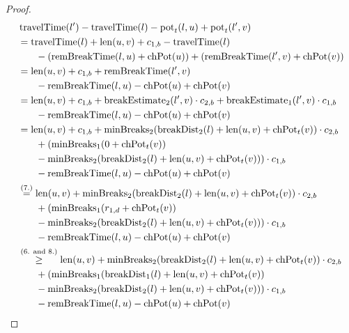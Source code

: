 \begin{proof}
	\begin{align}
		\begin{split}\label{eq:label_n_feasibility_proof_2}
			&\concretett(l') - \concretett(l) - \concretepotential_t(l,u) + \concretepotential_t(l',v)\\
			&= \concretett(l) + \len(u,v) + \restr_{1,b} - \concretett(l)\\
			& \phantom{{}=1} - (\remBreak(l,u) + \chpotential(u)) + (\remBreak(l',v) + \chpotential(v))\\
			&= \len(u,v) + \restr_{1,b} + \remBreak(l',v)\\
			& \phantom{{}=1} - \remBreak(l,u) - \chpotential(u)  + \chpotential(v)\\
			&= \len(u,v) + \restr_{1,b} + \breakEstimate_2(l',v) \cdot \restr_{2,b} + \breakEstimate_1(l',v) \cdot \restr_{1,b}\\
			& \phantom{{}=1} - \remBreak(l,u) - \chpotential(u)  + \chpotential(v)\\
			&= \len(u,v) + \restr_{1,b} + \minBreaks_2(\breakDist_2(l) + \len(u,v) + \chpotential_t(v)) \cdot \restr_{2,b}\\
			& \phantom{{}=1} + (\minBreaks_1(0 + \chpotential_t(v))\\
			& \phantom{{}=1} - \minBreaks_2(\breakDist_2(l) + \len(u,v) + \chpotential_t(v))) \cdot \restr_{1,b}\\
			& \phantom{{}=1} - \remBreak(l,u) - \chpotential(u) + \chpotential(v)\\
			&\stackrel{\text{(7.)}}{ =} \len(u,v) + \minBreaks_2(\breakDist_2(l) + \len(u,v) + \chpotential_t(v)) \cdot \restr_{2,b}\\
			& \phantom{{}=1} + (\minBreaks_1(r_{1,d} + \chpotential_t(v))\\
			& \phantom{{}=1} - \minBreaks_{2}(\breakDist_{2}(l) + \len(u,v) + \chpotential_t(v))) \cdot \restr_{1,b} \\
			& \phantom{{}=1} - \remBreak(l,u) - \chpotential(u) + \chpotential(v)\\
			&\stackrel{\text{(6. and 8.)}}{\ge} \len(u,v) + \minBreaks_2(\breakDist_2(l) + \len(u,v) + \chpotential_t(v)) \cdot \restr_{2,b}\\
			& \phantom{{}=1} + (\minBreaks_1(\breakDist_1(l) + \len(u,v) + \chpotential_t(v))\\
			& \phantom{{}=1} - \minBreaks_{2}(\breakDist_{2}(l) + \len(u,v) + \chpotential_t(v))) \cdot \restr_{1,b} \\
			& \phantom{{}=1} - \remBreak(l,u) - \chpotential(u) + \chpotential(v)\\

\end{split}
\end{align}
\end{proof}
